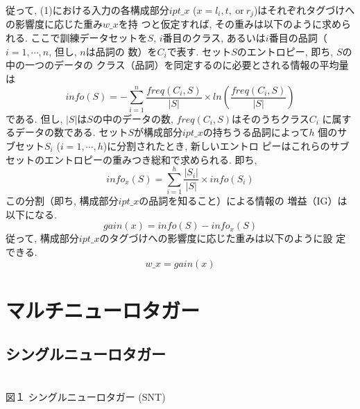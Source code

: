 従って, (1)における入力の各構成部分$ipt\_x$ ($x=l_{i}, 
t, \ \mbox{or} \ r_{j}$)はそれぞれタグづけへの影響度に応じた重み$w\_x$を持
つと仮定すれば, その重みは以下のように求められる. ここで訓練データセットを$S$,
$i$番目のクラス, あるいは$i$番目の品詞（$i=1, \cdots, n$, 但し, $n$は品詞の
数）を$C_{i}$で表す.  セット$S$のエントロピー, 即ち, $S$の中の一つのデータの
クラス（品詞）を同定するのに必要とされる情報の平均量は
\begin{equation}
info(S)=-\sum_{i=1}^{n}\frac{freq(C_{i},S)}{|S|} \times
ln(\frac{freq(C_{i},S)}{|S|})
\end{equation}
である. 但し, $|S|$は$S$の中のデータの数, $freq(C_{i},S)$はそのうちクラス$C_{i}$
に属するデータの数である. セット$S$が構成部分$ipt\_x$の持ちうる品詞によって$h$
個のサブセット$S_{i}$ ($i=1, \cdots, h$)に分割されたとき, 新しいエントロ
ピーはこれらのサブセットのエントロピーの重みつき総和で求められる. 即ち,
\begin{equation}
info_{x}(S)=\sum_{i=1}^{h}\frac{|S_{i}|}{|S|} \times info(S_{i})
\end{equation}
この分割（即ち, 構成部分$ipt\_x$の品詞を知ること）による情報の
増益（IG）は以下になる.
\begin{equation}
gain(x)=info(S)-info_{x}(S)
\end{equation}
従って, 構成部分$ipt\_x$のタグづけへの影響度に応じた重みは以下のように設
定できる.
\begin{equation}
w\_x=gain(x)
\end{equation}

\section{マルチニューロタガー}
\subsection{シングルニューロタガー}


\begin{center}
\begin{minipage}[t]{8cm}
  \bigskip

\end{minipage}
\\ 図１ シングルニューロタガー (SNT)
\end{center}



